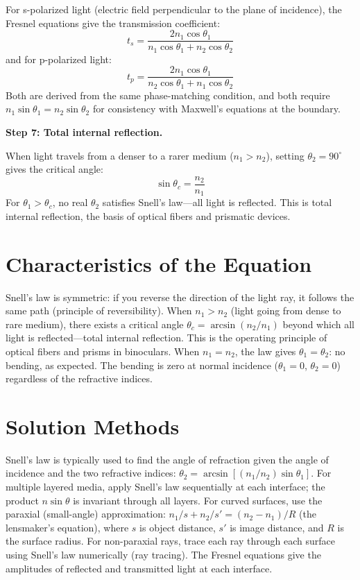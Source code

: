 For s-polarized light (electric field perpendicular to the plane of incidence), the Fresnel equations give the transmission coefficient:
\begin{equation}
t_s = \frac{2n_1\cos\theta_1}{n_1\cos\theta_1 + n_2\cos\theta_2}
\end{equation}
and for p-polarized light:
\begin{equation}
t_p = \frac{2n_1\cos\theta_1}{n_2\cos\theta_1 + n_1\cos\theta_2}
\end{equation}
Both are derived from the same phase-matching condition, and both require $n_1\sin\theta_1 = n_2\sin\theta_2$ for consistency with Maxwell's equations at the boundary.

\textbf{Step 7: Total internal reflection.}

When light travels from a denser to a rarer medium ($n_1 > n_2$), setting $\theta_2 = 90^\circ$ gives the critical angle:
\begin{equation}
\sin\theta_c = \frac{n_2}{n_1}
\end{equation}
For $\theta_1 > \theta_c$, no real $\theta_2$ satisfies Snell's law---all light is reflected. This is total internal reflection, the basis of optical fibers and prismatic devices.

\section*{Characteristics of the Equation}

Snell's law is symmetric: if you reverse the direction of the light ray, it follows the same path (principle of reversibility). When $n_1 > n_2$ (light going from dense to rare medium), there exists a critical angle $\theta_c = \arcsin(n_2/n_1)$ beyond which all light is reflected---total internal reflection. This is the operating principle of optical fibers and prisms in binoculars. When $n_1 = n_2$, the law gives $\theta_1 = \theta_2$: no bending, as expected. The bending is zero at normal incidence ($\theta_1 = 0$, $\theta_2 = 0$) regardless of the refractive indices.
\section*{Solution Methods}

Snell's law is typically used to find the angle of refraction given the angle of incidence and the two refractive indices: $\theta_2 = \arcsin[(n_1/n_2)\sin\theta_1]$. For multiple layered media, apply Snell's law sequentially at each interface; the product $n\sin\theta$ is invariant through all layers. For curved surfaces, use the paraxial (small-angle) approximation: $n_1/s + n_2/s' = (n_2 - n_1)/R$ (the lensmaker's equation), where $s$ is object distance, $s'$ is image distance, and $R$ is the surface radius. For non-paraxial rays, trace each ray through each surface using Snell's law numerically (ray tracing). The Fresnel equations give the amplitudes of reflected and transmitted light at each interface.
